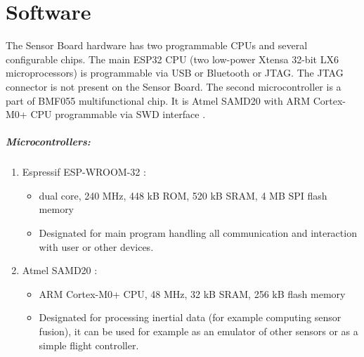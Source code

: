 \chapter{Software}
The Sensor Board hardware has two programmable CPUs and several configurable chips. The main ESP32 CPU (two low-power Xtensa 32-bit LX6 microprocessors) \cite{espressif:ESP-WROOM-32} is programmable via USB or Bluetooth or \ac{JTAG}. The \ac{JTAG} connector is not present on the Sensor Board. The second microcontroller is a part of BMF055 \cite{bosch:BMF055} multifunctional chip. It is Atmel SAMD20 \cite{atmel:SAMD20} with ARM Cortex-M0+ CPU programmable via \ac{SWD} interface \cite{SWDinterface}.

\paragraph{Microcontrollers:}
\begin{enumerate}
	\item Espressif ESP-WROOM-32 \cite{espressif:ESP-WROOM-32}:
	\begin{itemize}
		\item dual core, 240 MHz, 448 kB ROM, 520 kB SRAM, 4 MB SPI flash memory
		\item Designated for main program handling all communication and interaction with user or other devices.
	\end{itemize}
	\item Atmel SAMD20 \cite{atmel:samd20}:
	\begin{itemize}
		\item ARM Cortex-M0+ CPU, 48 MHz, 32 kB SRAM, 256 kB flash memory
		\item Designated for processing inertial data (for example computing sensor fusion), it can be used for example as an emulator of other sensors or as a simple flight controller.
	\end{itemize}
\end{enumerate}

